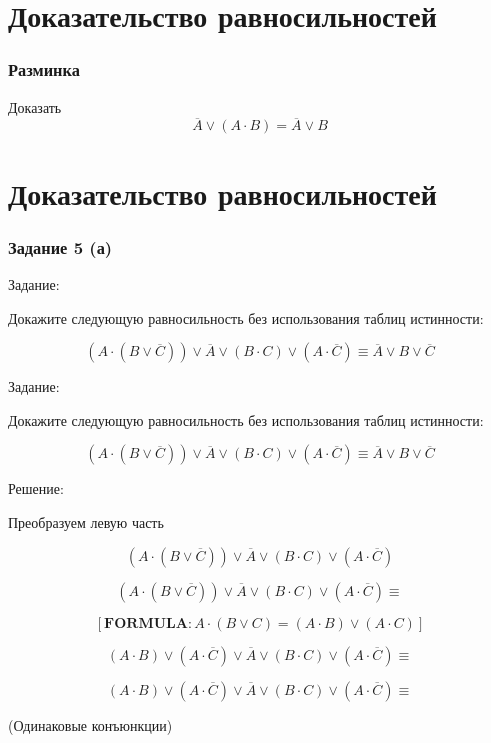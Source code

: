 \documentclass[10pt]{beamer}
\theoremstyle{remark}
\theoremstyle{definition}
\begin{document}
\section{Доказательство равносильностей}
\begin{frame}[allowframebreaks]
\frametitle{Разминка}

Доказать $$\overline{A} \vee (A \cdot B) = \overline{A} \vee B$$

\end{frame}


\section{Доказательство равносильностей}
\begin{frame}[allowframebreaks]
\frametitle{Задание 5 (а)}

Задание: 

Докажите следующую равносильность без использования таблиц истинности: 

$$ (A \cdot (B \vee \overline{C})) \vee \overline{A} \vee (B \cdot C) \vee (A \cdot \overline{C}) \equiv \overline{A} \vee B \vee \overline{C} $$

\framebreak

Задание: 

Докажите следующую равносильность без использования таблиц истинности: 

$$ (A \cdot (B \vee \overline{C})) \vee \overline{A} \vee (B \cdot C) \vee (A \cdot \overline{C}) \equiv \overline{A} \vee B \vee \overline{C} $$

Решение: 

Преобразуем левую часть

$$(A \cdot (B \vee \overline{C})) \vee \overline{A} \vee (B \cdot C) \vee (A \cdot \overline{C}) $$

\framebreak

$$(A \cdot (B \vee \overline{C})) \vee \overline{A} \vee (B \cdot C) \vee (A \cdot \overline{C}) \equiv $$

$$[ \boldsymbol{FORMULA:}  A \cdot (B \vee C) = (A \cdot B) \vee (A \cdot C) ] $$


$$(A \cdot B) \vee (A \cdot \overline{C}) \vee \overline{A} \vee (B \cdot C) \vee (A \cdot \overline{C}) \equiv $$

\framebreak

$$(A \cdot B) \vee (A \cdot \overline{C}) \vee \overline{A} \vee (B \cdot C) \vee (A \cdot \overline{C}) \equiv $$

(Одинаковые конъюнкции)


\end{frame}
\end{document}
